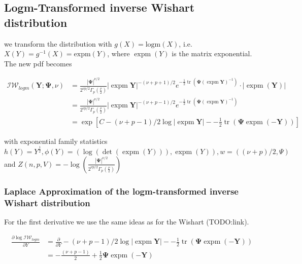 \subsection{Logm-Transformed inverse Wishart distribution}

we transform the distribution with $g(X) = \text{logm}(X)$, i.e. $X(Y) = g^{-1}(X) = \text{expm}(Y)$, where $\operatorname{expm}(Y)$ is the matrix exponential. The new pdf becomes 

\begin{subequations}
\begin{align}
	\mathcal{IW}_{logm}({\mathbf Y}; {\mathbf \Psi}, \nu) &= \frac{\left|{\mathbf\Psi}\right|^{\nu/2}}{2^{\nu p/2}\Gamma_p(\frac \nu 2)} \left|\operatorname{expm}\mathbf{Y}\right|^{-(\nu+p+1)/2} e^{-\frac{1}{2}\operatorname{tr}(\mathbf\Psi(\operatorname{expm}\mathbf{Y})^{-1})} \cdot |\operatorname{expm}(\mathbf{Y})|\\
	&=  \frac{\left|{\mathbf\Psi}\right|^{\nu/2}}{2^{\nu p/2}\Gamma_p(\frac \nu 2)} \left|\operatorname{expm}\mathbf{Y}\right|^{-(\nu+p-1)/2} e^{-\frac{1}{2}\operatorname{tr}(\mathbf\Psi(\operatorname{expm}\mathbf{Y})^{-1})} \\
	&= \exp\left[C - (\nu+p-1)/2\log  \left|\operatorname{expm}\mathbf{Y}\right| - -\frac{1}{2}\operatorname{tr}(\mathbf\Psi\operatorname{expm}(\mathbf{-Y}))\right]
\end{align}
\end{subequations}

with exponential family statistics $h(Y) = Y^\frac{1}{2}, \phi(Y) = (\log(\det(\operatorname{expm}(Y))), \operatorname{expm}(Y)), w = ((\nu + p)/2, \Psi)$ and $Z(n,p,V)=- \log\left(\frac{\left|{\mathbf\Psi}\right|^{\nu/2}}{2^{\nu p/2}\Gamma_p(\frac \nu 2)}\right)$

\subsubsection{Laplace Approximation of the logm-transformed inverse Wishart distribution}

For the first derivative we use the same ideas as for the Wishart (TODO:link). 

\begin{subequations}
\begin{align}
	\frac{\partial \log \mathcal{IW}_{logm}}{\partial Y} &= \frac{\partial}{\partial Y} -(\nu+p-1)/2\log  \left|\operatorname{expm}\mathbf{Y}\right| - -\frac{1}{2}\operatorname{tr}(\mathbf\Psi\operatorname{expm}(\mathbf{-Y}))\\
	&= -\frac{(\nu+p-1)}{2} + \frac{1}{2}\mathbf\Psi\operatorname{expm}(\mathbf{-Y})
\end{align}
\end{subequations}

